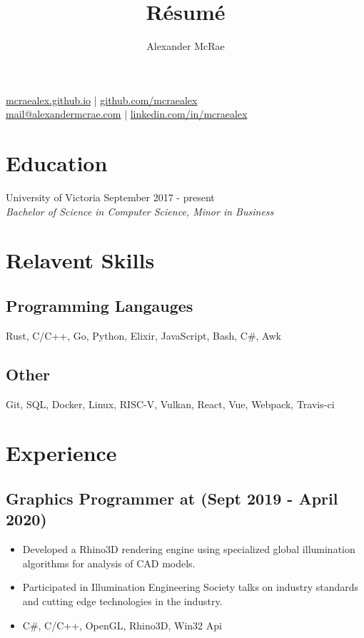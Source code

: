 \documentclass{article}
\makeatletter
\renewcommand{\maketitle}{
\begin{center}
{\huge \bfseries \theauthor}

\vspace{0.25em}
\url{mcraealex.github.io} | \url{github.com/mcraealex} \\
\href{mailto:mail@alexandermcrae.com}{mail@alexandermcrae.com} | \href{https://linkedin.com/in/mcraealex}{linkedin.com/in/mcraealex}
\end{center}}
\newcommand{\hrefColored}[3]{\href{#2}{\color{#1}{#3}}}
\makeatother
\begin{document}
\title{R\'esum\'e}
\author{Alexander McRae}

\maketitle

\section{Education}

\noindent University of Victoria \hfill September 2017 - present\\
\textit{Bachelor of Science in Computer Science, Minor in Business}

\section{Relavent Skills}

\subsection{Programming Langauges}

Rust, C/C++, Go, Python, Elixir, JavaScript, Bash, C\#, Awk

\subsection{Other}

Git, SQL, Docker, Linux, RISC-V, Vulkan, React, Vue, Webpack, Travis-ci

\section{Experience}

\subsection{Graphics Programmer at \hrefColored{blue}{https://www.suntrackertech.com}{Suntracker Technologies Ltd} (Sept 2019 - April 2020)}

\begin{itemize}
    \item Developed a Rhino3D rendering engine using specialized global illumination algorithms for analysis of CAD models. 
    \item Participated in Illumination Engineering Society talks on industry standards and cutting edge technologies in the industry.
    \item C\#, C/C++, OpenGL, Rhino3D, Win32 Api
\end{itemize}
\end{document}
